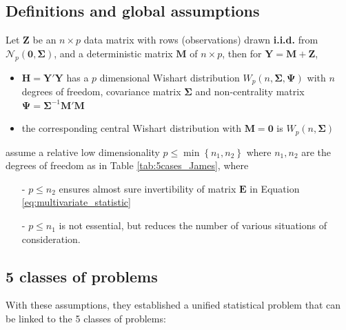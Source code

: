 \documentclass[twoside]{article}
\begin{document}
\subsection{Definitions and global assumptions}
Let $\mathbf{Z}$ be an $n\times p$ data matrix with rows (observations) drawn \textbf{i.i.d.} from $\mathcal{N}_p(\mathbf{0},\boldsymbol{\Sigma})$, and a deterministic matrix $\mathbf{M}$ of $n\times p$, then for $\mathbf{Y} = \mathbf{M}+ \mathbf{Z}$, 
\begin{itemize}
    \item $\mathbf{H} = \mathbf{Y'Y}$ has a $p$ dimensional Wishart distribution $W_p(n,\boldsymbol{\Sigma,\Psi})$ with $n$ degrees of freedom, covariance matrix $\boldsymbol{\Sigma}$ and non-centrality matrix $\boldsymbol{\Psi}=\boldsymbol{\Sigma}^{-1}\mathbf{M'M}$
    \item the corresponding central Wishart distribution with $\mathbf{M}=\mathbf{0}$ is $W_p(n,\boldsymbol{\Sigma})$
\end{itemize}
\citet{johnstone2020testing} assume a relative low dimensionality $p\leq \min\left\{ n_1,n_2 \right\}$ where $n_1,n_2$ are the degrees of freedom as in Table \ref{tab:5cases_James}, where 
\begin{itemize}
    \item[-] $p\leq n_2$ ensures almost sure invertibility of matrix $\mathbf{E}$ in Equation \ref{eq:multivariate_statistic} 
    \item[-] $p\leq n_1$ is not essential, but reduces the number of various situations of consideration.
\end{itemize}

\subsection{5 classes of problems}
With these assumptions, they established a unified statistical problem  that can be linked to the 5 classes of problems:
\end{document}
